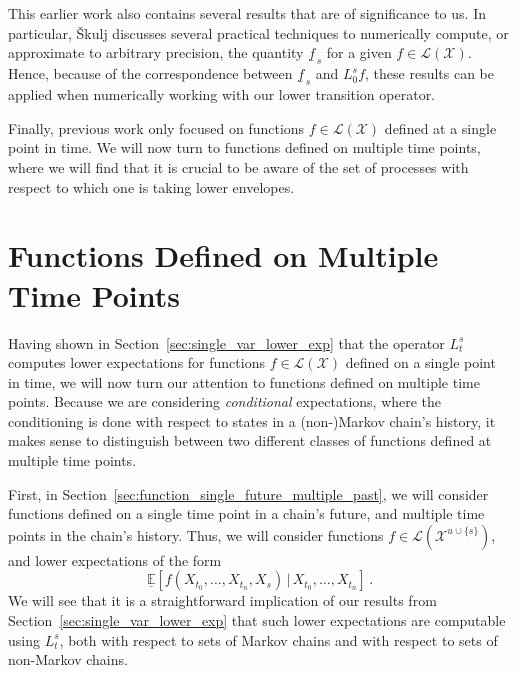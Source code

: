 \documentclass[10pt]{paper}
\theoremstyle{definition}
\newcommand{\states}{\mathcal{X}}
\newcommand{\gambles}{\mathcal{L}}
\newcommand{\gamblesX}{\gambles(\states)}
\begin{document}
This earlier work also contains several results that are of significance to us. In particular, {\v{S}}kulj discusses several practical techniques to numerically compute, or approximate to arbitrary precision, the quantity $\underline{f}_{\,s}$ for a given $f\in\gamblesX$. Hence, because of the correspondence between $\underline{f}_{\,s}$ and $L_0^sf$, these results can be applied when numerically working with our lower transition operator.

Finally, previous work only focused on functions $f\in\gamblesX$ defined at a single point in time. We will now turn to functions defined on multiple time points, where we will find that it is crucial to be aware of the set of processes with respect to which one is taking lower envelopes.

\section{Functions Defined on Multiple Time Points}\label{sec:funcs_multi_time_points}

Having shown in Section~\ref{sec:single_var_lower_exp} that the operator $L_t^s$ computes lower expectations for functions $f\in\gamblesX$ defined on a single point in time, we will now turn our attention to functions defined on multiple time points. Because we are considering \emph{conditional} expectations, where the conditioning is done with respect to states in a (non-)Markov chain's history, it makes sense to distinguish between two different classes of functions defined at multiple time points. 

First, in Section~\ref{sec:function_single_future_multiple_past}, we will consider functions defined on a single time point in a chain's future, and multiple time points in the chain's history. Thus, we will consider functions $f\in\gambles(\states^{u\cup\{s\}})$, and lower expectations of the form
\begin{equation*}
\underline{\mathbb{E}}\left[f(X_{t_0},\ldots,X_{t_n},X_s)\,\vert\,X_{t_0},\ldots,X_{t_n}\right]\,.
\end{equation*}
We will see that it is a straightforward implication of our results from Section~\ref{sec:single_var_lower_exp} that such lower expectations are computable using $L_t^s$, both with respect to sets of Markov chains and with respect to sets of non-Markov chains.
\end{document}
